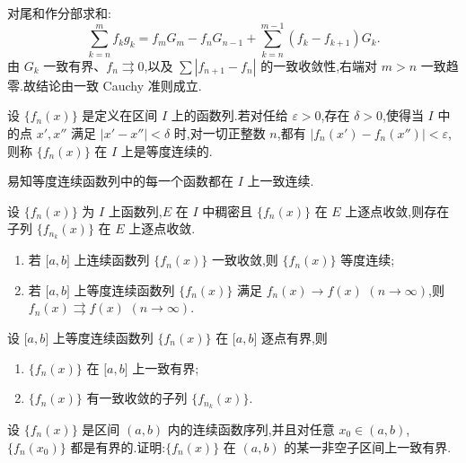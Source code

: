 \begin{solution}
    对尾和作分部求和:
    \[
        \sum\limits_{k=n}^{m}f_kg_k
        =f_mG_m-f_nG_{n-1}
        +\sum\limits_{k=n}^{m-1}(f_k-f_{k+1})G_k.
    \]
    由 $G_k$ 一致有界、$f_n\rightrightarrows0$,以及
    $\sum|f_{n+1}-f_n|$ 的一致收敛性,右端对 $m>n$ 一致趋零.故结论由一致 Cauchy 准则成立.
\end{solution}

\begin{definition}
    设 $\{f_n(x)\}$ 是定义在区间 $I$ 上的函数列.若对任给 $\varepsilon>0$,存在 $\delta>0$,使得当 $I$ 中的点 $x',x''$ 满足 $|x'-x''|<\delta$ 时,对一切正整数 $n$,都有 $|f_n(x')-f_n(x'')|<\varepsilon$,则称 $\{f_n(x)\}$ 在 $I$ 上是等度连续的.
\end{definition}

\begin{remark}
    易知等度连续函数列中的每一个函数都在 $I$ 上一致连续.
\end{remark}

\begin{theorem}[
        \markstar]
    设 $\{f_n(x)\}$ 为 $I$ 上函数列,$E$ 在 $I$ 中稠密且 $\{f_n(x)\}$ 在 $E$ 上逐点收敛,则存在子列 $\{f_{n_k}(x)\}$ 在 $E$ 上逐点收敛.
\end{theorem}

\begin{theorem}[\markstar]
    \begin{enumerate}
        \item 若 $\lbrack a,b\rbrack$ 上连续函数列 $\{f_n(x)\}$ 一致收敛,则 $\{f_n(x)\}$ 等度连续;
        \item 若 $\lbrack a,b\rbrack$ 上等度连续函数列 $\{f_n(x)\}$ 满足 $f_n(x)\to f(x)$ $(n\to\infty)$,则 $f_n(x)\rightrightarrows f(x)$ $(n\to\infty)$.
    \end{enumerate}
\end{theorem}

\begin{theorem}[\markstar]
    设 $\lbrack a,b\rbrack$ 上等度连续函数列 $\{f_n(x)\}$ 在 $\lbrack a,b\rbrack$ 逐点有界,则
    \begin{enumerate}
        \item $\{f_n(x)\}$ 在 $\lbrack a,b\rbrack$ 上一致有界;
        \item $\{f_n(x)\}$ 有一致收敛的子列 $\{f_{n_k}(x)\}$.
    \end{enumerate}
\end{theorem}

\begin{example}
    设 $\{f_n(x)\}$ 是区间 $(a,b)$ 内的连续函数序列,并且对任意 $x_0\in(a,b)$,$\{f_n(x_0)\}$ 都是有界的.证明:$\{f_n(x)\}$ 在 $(a,b)$ 的某一非空子区间上一致有界.
\end{example}
\exampleblank

